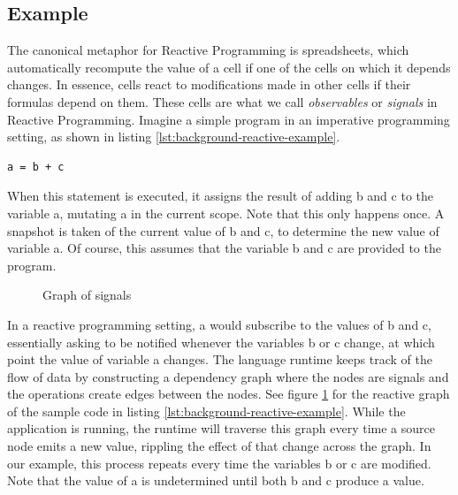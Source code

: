 \subsection{Example}

The canonical metaphor for Reactive Programming is spreadsheets, which automatically recompute the value of a cell if one of the cells on which it depends changes. In essence, cells react to modifications made in other cells if their formulas depend on them. These cells are what we call \textit{observables} or \textit{signals} in Reactive Programming.
Imagine a simple program in an imperative programming setting, as shown in listing \ref{lst:background-reactive-example}.

\begin{lstlisting}[caption={A basic reactive program},captionpos=b,label={lst:background-reactive-example},language=FrDataFlow]
	a = b + c
\end{lstlisting}

When this statement is executed, it assigns the result of adding b and c to the variable a, mutating a in the current scope. Note that this only happens once. A snapshot is taken of the current value of b and c, to determine the new value of variable a. Of course, this assumes that the variable b and c are provided to the program.

\begin{figure}[h]
	\caption{Graph of signals}
	\label{fig:background-reactive-example}
\end{figure}

In a reactive programming setting, a would subscribe to the values of b and c, essentially asking to be notified whenever the variables b or c change, at which point the value of variable a changes. The language runtime keeps track of the flow of data by constructing a dependency graph where the nodes are signals and the operations create edges between the nodes. See figure \ref{fig:background-reactive-example} for the reactive graph of the sample code in listing \ref{lst:background-reactive-example}. While the application is running, the runtime will traverse this graph every time a source node emits a new value, rippling the effect of that change across the graph.  In our example, this process repeats every time the variables b or c are modified. Note that the value of a is undetermined until both b and c produce a value. 

